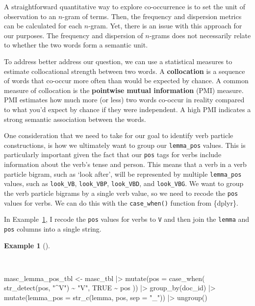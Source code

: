 \documentclass[
  letterpaper,
]{latex/krantz}
\newenvironment{Shaded}{\begin{snugshade}}{\end{snugshade}}
\newcommand{\AttributeTok}[1]{\textcolor[rgb]{0.00,0.00,0.00}{#1}}
\newcommand{\ConstantTok}[1]{\textcolor[rgb]{0.00,0.00,0.00}{#1}}
\newcommand{\FunctionTok}[1]{\textcolor[rgb]{0.00,0.00,0.00}{#1}}
\newcommand{\NormalTok}[1]{\textcolor[rgb]{0.00,0.00,0.00}{#1}}
\newcommand{\OtherTok}[1]{\textcolor[rgb]{0.00,0.00,0.00}{#1}}
\newcommand{\SpecialCharTok}[1]{\textcolor[rgb]{0.00,0.00,0.00}{#1}}
\newcommand{\StringTok}[1]{\textcolor[rgb]{0.00,0.00,0.00}{#1}}
\theoremstyle{definition}
\newtheorem{example}{Example}[chapter]
\theoremstyle{remark}
\begin{document}
A straightforward quantitative way to explore co-occurrence is to set
the unit of observation to an \(n\)-gram of terms. Then, the frequency
and dispersion metrics can be calculated for each \(n\)-gram. Yet, there
is an issue with this approach for our purposes. The frequency and
dispersion of \(n\)-grams does not necessarily relate to whether the two
words form a semantic unit.

To address better address our question, we can use a statistical
measures to estimate collocational strength between two words. A
\textbf{collocation} is a sequence of words that co-occur more often
than would be expected by chance. A common measure of collocation is the
\textbf{pointwise mutual information} (PMI) measure. PMI estimates how
much more (or less) two words co-occur in reality compared to what you'd
expect by chance if they were independent. A high PMI indicates a strong
semantic association between the words.

One consideration that we need to take for our goal to identify verb
particle constructions, is how we ultimately want to group our
\texttt{lemma\_pos} values. This is particularly important given the
fact that our \texttt{pos} tags for verbs include information about the
verb's tense and person. This means that a verb in a verb particle
bigram, such as `look after', will be represented by multiple
\texttt{lemma\_pos} values, such as \texttt{look\_VB},
\texttt{look\_VBP}, \texttt{look\_VBD}, and \texttt{look\_VBG}. We want
to group the verb particle bigrams by a single verb value, so we need to
recode the \texttt{pos} values for verbs. We can do this with the
\texttt{case\_when()} function from \{dplyr\}.

In Example~\ref{exm-explore-masc-lemma-pos}, I recode the \texttt{pos}
values for verbs to \texttt{V} and then join the \texttt{lemma} and
\texttt{pos} columns into a single string.

\begin{example}[]\protect\hypertarget{exm-explore-masc-lemma-pos}{}\label{exm-explore-masc-lemma-pos}

~

\begin{Shaded}
\begin{Highlighting}[]
\NormalTok{masc\_lemma\_pos\_tbl }\OtherTok{\textless{}{-}}
\NormalTok{  masc\_tbl }\SpecialCharTok{|\textgreater{}}
  \FunctionTok{mutate}\NormalTok{(}\AttributeTok{pos =} \FunctionTok{case\_when}\NormalTok{(}
    \FunctionTok{str\_detect}\NormalTok{(pos, }\StringTok{"\^{}V"}\NormalTok{) }\SpecialCharTok{\textasciitilde{}} \StringTok{"V"}\NormalTok{,}
    \ConstantTok{TRUE} \SpecialCharTok{\textasciitilde{}}\NormalTok{ pos}
\NormalTok{  )) }\SpecialCharTok{|\textgreater{}}
  \FunctionTok{group\_by}\NormalTok{(doc\_id) }\SpecialCharTok{|\textgreater{}}
  \FunctionTok{mutate}\NormalTok{(}\AttributeTok{lemma\_pos =} \FunctionTok{str\_c}\NormalTok{(lemma, pos, }\AttributeTok{sep =} \StringTok{"\_"}\NormalTok{)) }\SpecialCharTok{|\textgreater{}}
  \FunctionTok{ungroup}\NormalTok{()}
\end{Highlighting}
\end{Shaded}

\end{example}
\end{document}
